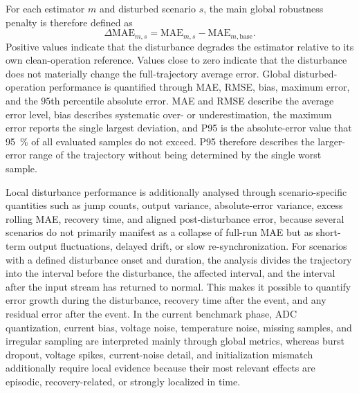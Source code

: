 \documentclass[
    a4paper,
    12pt,
    titlepage,
    bibliography=totoc,
    twoside=on,
    parskip=false,
    numbers=noenddot,
    cleardoublepage=empty,
    DIV=12,
    BCOR=12.0mm,
    headheight=36pt,
    headings=openright
]{scrreprt}
\begin{document}
For each estimator $m$ and disturbed scenario $s$, the main global robustness penalty is therefore defined as
\begin{equation}
    \Delta\mathrm{MAE}_{m,s}
    =
    \mathrm{MAE}_{m,s}
    -
    \mathrm{MAE}_{m,\mathrm{base}} .
    \label{eq:robustness_delta_mae}
\end{equation}
Positive values indicate that the disturbance degrades the estimator relative to its own clean-operation reference. Values close to zero indicate that the disturbance does not materially change the full-trajectory average error. Global disturbed-operation performance is quantified through MAE, RMSE, bias, maximum error, and the $95$th percentile absolute error. MAE and RMSE describe the average error level, bias describes systematic over- or underestimation, the maximum error reports the single largest deviation, and P95 is the absolute-error value that \SI{95}{\percent} of all evaluated samples do not exceed. P95 therefore describes the larger-error range of the trajectory without being determined by the single worst sample.

Local disturbance performance is additionally analysed through scenario-specific quantities such as jump counts, output variance, absolute-error variance, excess rolling MAE, recovery time, and aligned post-disturbance error, because several scenarios do not primarily manifest as a collapse of full-run MAE but as short-term output fluctuations, delayed drift, or slow re-synchronization. For scenarios with a defined disturbance onset and duration, the analysis divides the trajectory into the interval before the disturbance, the affected interval, and the interval after the input stream has returned to normal. This makes it possible to quantify error growth during the disturbance, recovery time after the event, and any residual error after the event. In the current benchmark phase, ADC quantization, current bias, voltage noise, temperature noise, missing samples, and irregular sampling are interpreted mainly through global metrics, whereas burst dropout, voltage spikes, current-noise detail, and initialization mismatch additionally require local evidence because their most relevant effects are episodic, recovery-related, or strongly localized in time.
\end{document}
